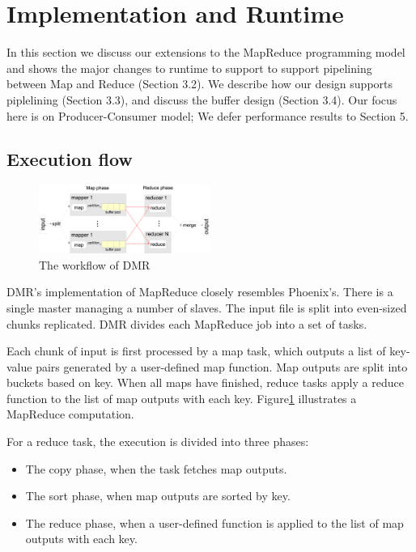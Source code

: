 \section{Implementation and Runtime}
In this section we discuss our extensions to 
the MapReduce programming model and shows the major changes to runtime to 
support \myds
to support pipelining between Map and Reduce (Section 3.2). 
We describe how our design supports
piplelining (Section 3.3), and discuss the buffer design (Section 3.4). 
Our focus here is on Producer-Consumer model; 
We defer performance results to Section 5.



\subsection{Execution flow}
\begin{figure}[!h!t]  
    \centering
    \includegraphics[width=0.5\textwidth]{eps/dmr_workflow.eps}
    \caption{The workflow of DMR}
    \label{fig:dmr:workflow}
\end{figure}

DMR’s implementation of MapReduce closely resembles Phoenix’s. 
There is a single master managing a number of slaves. 
The input file is split into even-sized chunks replicated. 
DMR divides each MapReduce job into a set of tasks. 

Each chunk of input is first processed by a map task, 
which outputs a list of key-value pairs generated 
by a user-defined map function. 
Map outputs are split into buckets based on key. 
When all maps have finished, reduce tasks
apply a reduce function to the list of map outputs with
each key. Figure\ref{fig:dmr:workflow} illustrates a MapReduce computation.

For a reduce task, the execution is divided into
three phases:
\begin{itemize}
  \item The copy phase, when the task fetches map outputs.
  \item The sort phase, when map outputs are sorted by key.
  \item The reduce phase, when a user-defined function is
applied to the list of map outputs with each key.
\end{itemize}




